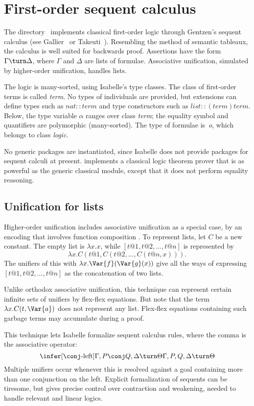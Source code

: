 \chapter{First-order sequent calculus}
The directory~ implements classical first-order logic through
Gentzen's sequent calculus (see Gallier~\cite{gallier86} or
Takeuti~\cite{takeuti87}).  Resembling the method of semantic tableaux, the
calculus is well suited for backwards proof.  Assertions have the form
\(\Gamma\turn \Delta\), where \(\Gamma\) and \(\Delta\) are lists of
formulae.  Associative unification, simulated by higher-order unification,
handles lists.

The logic is many-sorted, using Isabelle's type classes.  The
class of first-order terms is called {\it term}.  No types of individuals
are provided, but extensions can define types such as $nat::term$ and type
constructors such as $list::(term)term$.  Below, the type variable $\alpha$
ranges over class {\it term\/}; the equality symbol and quantifiers are
polymorphic (many-sorted).  The type of formulae is~{\it o}, which belongs
to class {\it logic}.  

No generic packages are instantiated, since Isabelle does not provide
packages for sequent calculi at present.  \LK{} implements a classical
logic theorem prover that is as powerful as the generic classical module,
except that it does not perform equality reasoning.


\section{Unification for lists}
Higher-order unification includes associative unification as a special
case, by an encoding that involves function composition
\cite[page~37]{huet78}.  To represent lists, let $C$ be a new constant.
The empty list is $\lambda x.x$, while $[t@1,t@2,\ldots,t@n]$ is
represented by
\[ \lambda x.C(t@1,C(t@2,\ldots,C(t@n,x))).  \]
The unifiers of this with $\lambda x.\Var{f}(\Var{g}(x))$ give all the ways
of expressing $[t@1,t@2,\ldots,t@n]$ as the concatenation of two lists.

Unlike orthodox associative unification, this technique can represent certain
infinite sets of unifiers by flex-flex equations.   But note that the term
$\lambda x.C(t,\Var{a})$ does not represent any list.  Flex-flex equations
containing such garbage terms may accumulate during a proof.

This technique lets Isabelle formalize sequent calculus rules,
where the comma is the associative operator:
\[ \infer[\conj\hbox{-left}]
	 {\Gamma,P\conj Q,\Delta \turn \Theta}
         {\Gamma,P,Q,\Delta \turn \Theta}  \] 
Multiple unifiers occur whenever this is resolved against a goal containing
more than one conjunction on the left.  Explicit formalization of sequents
can be tiresome, but gives precise control over contraction and weakening,
needed to handle relevant and linear logics.

